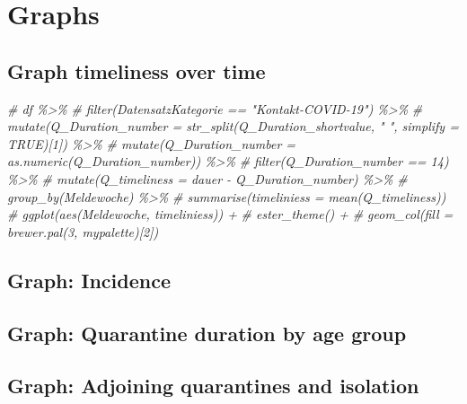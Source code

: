 \documentclass[
]{article}
\newenvironment{Shaded}{\begin{snugshade}}{\end{snugshade}}
\newcommand{\CommentTok}[1]{\textcolor[rgb]{0.56,0.35,0.01}{\textit{#1}}}
\begin{document}
\hypertarget{graphs}{%
\section{Graphs}\label{graphs}}

\hypertarget{graph-timeliness-over-time}{%
\subsection{Graph timeliness over
time}\label{graph-timeliness-over-time}}

\begin{Shaded}
\begin{Highlighting}[]
\CommentTok{\# df \%\textgreater{}\%}
\CommentTok{\#   filter(DatensatzKategorie == "Kontakt{-}COVID{-}19") \%\textgreater{}\%}
\CommentTok{\#   mutate(Q\_Duration\_number = str\_split(Q\_Duration\_shortvalue, " ", simplify = TRUE)[1]) \%\textgreater{}\%}
\CommentTok{\#   mutate(Q\_Duration\_number = as.numeric(Q\_Duration\_number)) \%\textgreater{}\%}
\CommentTok{\#   filter(Q\_Duration\_number == 14) \%\textgreater{}\%}
\CommentTok{\#   mutate(Q\_timeliness = dauer {-} Q\_Duration\_number) \%\textgreater{}\%}
\CommentTok{\#   group\_by(Meldewoche) \%\textgreater{}\%}
\CommentTok{\#   summarise(timeliniess = mean(Q\_timeliness))}
\CommentTok{\#   ggplot(aes(Meldewoche, timeliniess)) +}
\CommentTok{\#   ester\_theme() +}
\CommentTok{\#   geom\_col(fill = brewer.pal(3, mypalette)[2])}
\end{Highlighting}
\end{Shaded}

\hypertarget{graph-incidence}{%
\subsection{Graph: Incidence}\label{graph-incidence}}

\hypertarget{graph-quarantine-duration-by-age-group}{%
\subsection{Graph: Quarantine duration by age
group}\label{graph-quarantine-duration-by-age-group}}

\hypertarget{graph-adjoining-quarantines-and-isolation}{%
\subsection{Graph: Adjoining quarantines and
isolation}\label{graph-adjoining-quarantines-and-isolation}}
\end{document}

